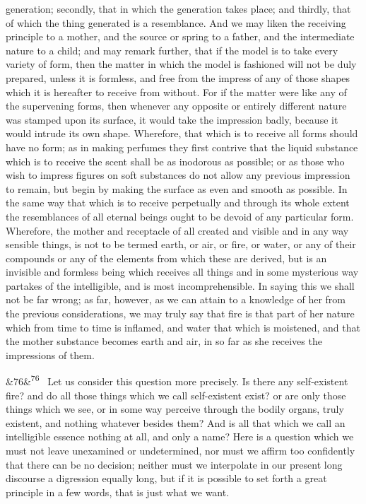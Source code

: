 \documentclass[12pt]{article}
\newcommand{\para}[1][]{\par\noindent\ifx&#1&\else\textsuperscript{\footnotesize #1}~\fi}
\begin{document}
generation; secondly, that in which the generation takes place; and thirdly, that of which the thing generated is a resemblance. And we may liken the receiving principle to a mother, and the source or spring to a father, and the intermediate nature to a child; and may remark further, that if the model is to take every variety of form, then the matter in which the model is fashioned will not be duly prepared, unless it is formless, and free from the impress of any of those shapes which it is hereafter to receive from without. For if the matter were like any of the supervening forms, then whenever any opposite or entirely different nature was stamped upon its surface, it would take the impression badly, because it would intrude its own shape. Wherefore, that which is to receive all forms should have no form; as in making perfumes they first contrive that the liquid substance which is to receive the scent shall be as inodorous as possible; or as those who wish to impress figures on soft substances do not allow any previous impression to remain, but begin by making the surface as even and smooth as possible. In the same way that which is to receive perpetually and through its whole extent the resemblances of all eternal beings ought to be devoid of any particular form. Wherefore, the mother and receptacle of all created and visible and in any way sensible things, is not to be termed earth, or air, or fire, or water, or any of their compounds or any of the elements from which these are derived, but is an invisible and formless being which receives all things and in some mysterious way partakes of the intelligible, and is most incomprehensible. In saying this we shall not be far wrong; as far, however, as we can attain to a knowledge of her from the previous considerations, we may truly say that fire is that part of her nature which from time to time is inflamed, and water that which is moistened, and that the mother substance becomes earth and air, in so far as she receives the impressions of them.

\para[76] Let us consider this question more precisely. Is there any self-existent fire? and do all those things which we call self-existent exist? or are only those things which we see, or in some way perceive through the bodily organs, truly existent, and nothing whatever besides them? And is all that which we call an intelligible essence nothing at all, and only a name? Here is a question which we must not leave unexamined or undetermined, nor must we affirm too confidently that there can be no decision; neither must we interpolate in our present long discourse a digression equally long, but if it is possible to set forth a great principle in a few words, that is just what we want.
\end{document}
